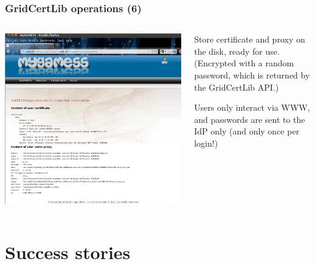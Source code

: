 \documentclass{beamer}
\newcommand{\+}{\vspace{1em}}
\begin{document}
\begin{frame}
  \frametitle{GridCertLib operations (6)}
  \begin{columns}
    \begin{column}{0.45\textwidth}
      \includegraphics[width=\linewidth]{mygamess}
    \end{column}
    \begin{column}{0.55\textwidth}
      \begin{center}
        Store certificate and proxy on the disk, ready for use.
        \\
        {\footnotesize (Encrypted with a random password, which is
          returned by the GridCertLib API.)}
      
        \+ {Users only interact via WWW, and
          passwords are sent to the IdP only (and only once per
          login!)}
      \end{center}
    \end{column}
  \end{columns}
\end{frame}


\section[Implementation]{Success stories}
\end{document}
